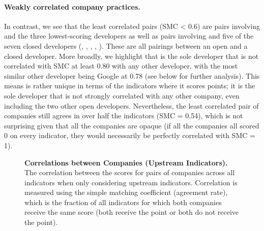 \paragraph{Weakly correlated company practices.}
In contrast, we see that the least correlated pairs (SMC < 0.6) are pairs involving \meta and the three lowest-scoring developers as well as pairs involving \huggingface and five of the seven closed developers (\openai, \cohere, \aitwentyone, \inflection, \amazon).
These are all pairings between an open and a closed developer.
More broadly, we highlight that \meta is the sole developer that is not correlated with SMC at least 0.80 with any other developer, with the most similar other developer being Google at 0.78 (see below for further analysis). 
This means \meta is rather unique in terms of the indicators where it scores points; it is the sole developer that is not strongly correlated with any other company, even including the two other open developers.
Nevertheless, the least correlated pair of companies still agrees in over half the indicators (SMC = 0.54), which is not surprising given that all the companies are opaque (\eg if all the companies all scored 0 on every indicator, they would necessarily be perfectly correlated with SMC = 1).

\begin{figure}
\caption{\textbf{Correlations between Companies (Upstream Indicators).} The correlation between the scores for pairs of companies across all indicators when only considering upstream indicators. Correlation is measured using the simple matching coefficient (\ie agreement rate), which is the fraction of all indicators for which both companies receive the same score (\ie both receive the point or both do not receive the point).
}
\label{fig:upstream-correlations}
\end{figure}

